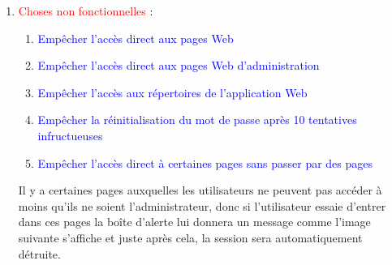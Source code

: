 \documentclass{article}
\begin{document}
\begin{enumerate}
 \vspace{0.7cm}
               \hspace*{-0.7in}
               \noindent{}  
  
  
  
  
  
  
	\vspace{3cm}
 \item \textcolor{red}{\huge Choses non fonctionnelles} :  
   \vspace{0.7cm}
        
        \begin{enumerate}
        \item\textcolor{blue}{Empêcher l'accès direct aux pages Web}
        \item\textcolor{blue}{Empêcher l'accès direct aux pages Web d'administration}
        \item\textcolor{blue}{Empêcher l'accès aux répertoires de l'application Web}
        \item\textcolor{blue}{Empêcher la réinitialisation du mot de passe après 10 tentatives infructueuses}
        \item\textcolor{blue}{Empêcher l'accès direct à certaines pages sans passer par des pages}
        
        
        \end{enumerate} 
  
  Il y a certaines pages auxquelles les utilisateurs ne peuvent pas accéder à moins qu'ils ne soient l'administrateur, donc si l'utilisateur essaie d'entrer dans ces pages la boîte d'alerte lui donnera un message comme l'image suivante s'affiche et juste après cela, la session sera automatiquement détruite.
  

\end{enumerate}
\end{document}
